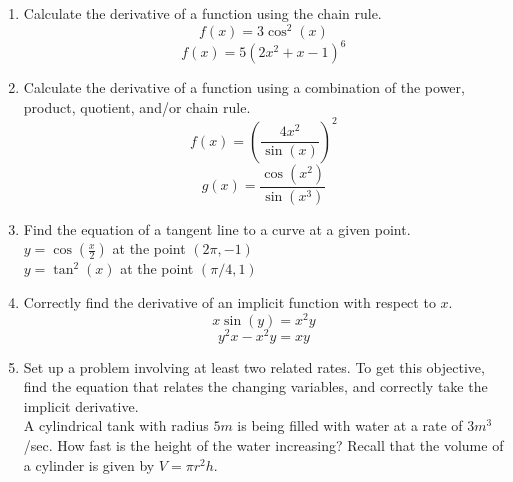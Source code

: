 \documentclass{exam}
\begin{document}
\begin{enumerate}
\item Calculate the derivative of a function using the chain rule.\\
$$f(x) = 3\cos^2(x)$$
$$f(x) = 5(2x^2 + x-1)^6$$
\item Calculate the derivative of a function using a combination of the power, product, quotient, and/or chain rule.\\
$$f(x) = \left(\dfrac{4x^2}{\sin(x)}\right)^2$$
$$g(x) = \frac{\cos(x^2)}{\sin(x^3)}$$
\item Find the equation of a tangent line to a curve at a given point.\\
$y = \cos(\frac{x}{2})$ at the point $(2\pi,-1)$\\
$y = \tan^2(x)$ at the point $(\pi/4,1)$
\item Correctly find the derivative of an implicit function with respect to $x$.\\
$$x\sin(y) = x^2y$$
$$y^2x - x^2y = xy$$
\item Set up a problem involving at least two related rates. To get this objective, find the equation that relates the changing variables, and correctly take the implicit derivative.\\
A cylindrical tank with radius $5m$ is being filled with water at a rate of $3m^3$/sec. How fast is the height of the water increasing? Recall that the volume of a cylinder is given by $V = \pi r^2 h$.\\

\end{enumerate}
\end{document}

